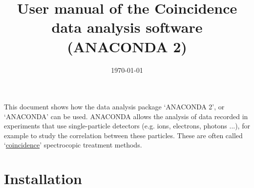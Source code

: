 \newpage


\title{User manual of the Coincidence data analysis software (ANACONDA 2)}
\date{\today} %


\maketitle
\tableofcontents
\newpage

This document shows how the data analysis package `ANACONDA 2', or `ANACONDA' can be used. ANACONDA allows the analysis of data recorded in experiments that use single-particle detectors (e.g. ions, electrons, photons ...), for example to study the correlation between these particles. These are often called `\href{https://www.sciencedirect.com/science/article/pii/S0368204815001310}{coincidence}' spectrocopic treatment methods.

%
%
%
%
%


\section{Installation}



